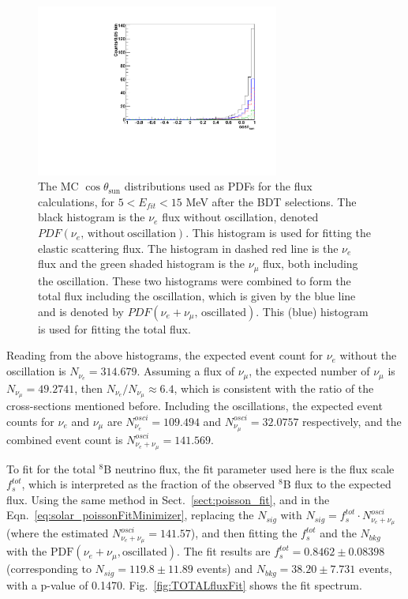 \begin{figure}[!htb]
	\centering
	\includegraphics[width=8cm]{MCfluxPdfs.pdf}
	\caption[The MC $\cos\theta_\mathrm{sun}$ distributions used as PDFs for the flux calculations, for $5<E_{fit}<15$ MeV after the BDT selections.]{The MC $\cos\theta_\mathrm{sun}$ distributions used as PDFs for the flux calculations, for $5<E_{fit}<15$ MeV after the BDT selections. The black histogram is the $\nu_e$ flux without oscillation, denoted $PDF(\nu_e, \, \mathrm{without~oscillation})$. This histogram is used for fitting the elastic scattering flux. The histogram in dashed red line is the $\nu_e$ flux and the green shaded histogram is the $\nu_\mu$ flux, both including the oscillation. These two histograms were combined to form the total flux including the oscillation, which is given by the blue line and is denoted by $PDF(\nu_e+\nu_\mu, \, \mathrm{oscillated})$. This (blue) histogram is used for fitting the total flux.}
	\label{fig:MCfluxPdfs}
\end{figure} 

Reading from the above histograms, the expected event count for $\nu_e$ without the oscillation is $N_{\nu_e} = 314.679$. Assuming a flux of $\nu_\mu$, the expected number of $\nu_\mu$ is $N_{\nu_\mu}=49.2741$, then $N_{\nu_e}/N_{\nu_\mu}\approx 6.4$, which is consistent with the ratio of the cross-sections mentioned before. Including the oscillations, the expected event counts for $\nu_e$ and $\nu_\mu$ are $N^{osci}_{\nu_e} = 109.494$ and $N^{osci}_{\nu_\mu} = 32.0757$ respectively, and the combined event count is $N^{osci}_{\nu_e+\nu_\mu}=141.569$. %
 
To fit for the total $^8$B neutrino flux, the fit parameter used here is the flux scale $f^{tot}_s$, which is interpreted as the fraction of the observed $^8$B flux to the expected flux. Using the same method in Sect.~\ref{sect:poisson_fit}, and in the Eqn.~\ref{eq:solar_poissonFitMinimizer}, replacing the $N_{sig}$ with $N_{sig}=f^{tot}_s\cdot N^{osci}_{\nu_e+\nu_\mu}$(where the estimated $N^{osci}_{\nu_e+\nu_\mu}=141.57$), and then fitting the $f^{tot}_s$ and the $N_{bkg}$ with the $\mathrm{PDF}(\nu_e+\nu_\mu,\mathrm{oscillated})$. The fit results are $f^{tot}_s=0.8462\pm 0.08398$ (corresponding to $N_{sig}=119.8\pm11.89$ events) and $N_{bkg}=38.20\pm7.731$ events, with a p-value of 0.1470. Fig.~\ref{fig:TOTALfluxFit} shows the fit spectrum.

